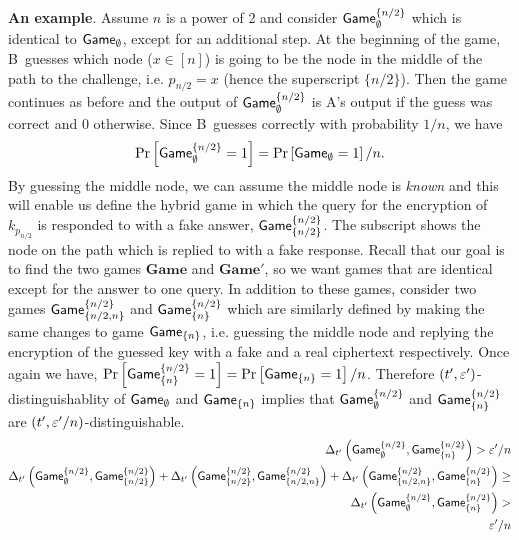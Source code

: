 \documentclass{article}
\def\B{{\sf B}}
\def\A{{\sf A}}
\newcommand{\game}{{\sf Game}}
\newcommand{\dgame}{{\mathbf{Game}}}
\newcommand{\dgg}[2]{\game_{#1}^{#2}}
\newcommand{\dgb}[2]{\game_{\cub{#1}}^{\cub{#2}}}
\begin{document}
\noindent \textbf{An example}. Assume $n$ is a power of 2 and consider $\game^{\{n/2\}}_{\emptyset}$ which is identical to $\game_{\emptyset}$, except for an additional step. At the beginning of the game, \B~guesses which node ($x\in [n]$) is going to be the node in the middle of the path to the challenge, i.e. $p_{n/2}=x$ (hence the superscript $\{n/2\}$). Then the game continues as before and the output of $\dgg{\emptyset}{\{n/2\}}$ is \A's output if the guess was correct and 0 otherwise. Since \B~guesses correctly with probability $1/n$, we have 
\[\prob{\dgg{\emptyset}{\cub{n/2}}=1}= \prob{\game_{\emptyset}=1}/n.\]
\noindent By guessing the middle node, we can assume the middle node is \textit{known} and this will enable us define the hybrid game in which the query for the encryption of $k_{p_{n/2}}$ is responded to with a fake answer, $\dgb{n/2}{n/2}$. The subscript shows the node on the path which is replied to with a fake response. Recall that our goal is to find the two games $\dgame$ and $\dgame'$, so we want games that are identical except for the answer to one query. In addition to these games, consider two games $\dgb{n/2,n}{n/2}$ and $\dgb{n}{n/2}$ which are similarly defined by making the same changes to game $\game_{\{n\}}$, i.e. guessing the middle node and replying the encryption of the guessed key with a fake and a real ciphertext respectively. Once again we have, $\prob{\dgb{n}{n/2}=1}= \prob{\game_{\{n\}}=1}/n$. Therefore $(t',\varepsilon')$-distinguishablity of $\game_{\emptyset}$ and $\game_{\{n\}}$ implies that $\dgg{\emptyset}{\cub{n/2}}$ and $\dgb{n}{n/2}$ are $(t',\varepsilon'/n)$-distinguishable.
\begin{align}
\dElta{\dgg{\emptyset}{\cub{n/2}},\dgb{n}{n/2}} > \eps'/n \\
\dElta{\dgg{\emptyset}{\cub{n/2}}, \dgb{n/2}{n/2}} + \dElta{ \dgb{n/2}{n/2},\dgb{n/2,n}{n/2}} + \dElta{ \dgb{n/2,n}{n/2}, \dgb{n}{n/2}} \geq \nonumber \\ \dElta{\dgg{\emptyset}{\cub{n/2}},\dgb{n}{n/2}} > \nonumber \\ \eps'/n \label{3.2} 
\end{align}
\end{document}
